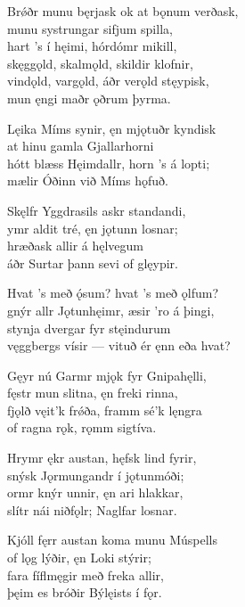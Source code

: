 \bva Brǿðr munu bęrjask \hld ok at bǫnum verðask, \\
munu systrungar \hld sifjum spilla, \\
hart ’s í hęimi, \hld hórdómr mikill, \\
skęggǫld, skalmǫld, \hld skildir klofnir, \\
vindǫld, vargǫld, \hld áðr verǫld stęypisk,\footnotemark[1] \\
mun ęngi maðr \hld ǫðrum þyrma.

\bva Lęika Míms synir, \hld ęn mjǫtuðr kyndisk \\
at hinu gamla \hld Gjallarhorni \\
hótt blæss Hęimdallr, \hld horn ’s á lopti; \\
mælir Óðinn \hld við Míms hǫfuð.

\bva Skęlfr Yggdrasils \hld askr standandi, \\
ymr aldit tré, \hld ęn jǫtunn losnar; \\
hræðask allir \hld á hęlvegum \\
áðr Surtar þann \hld sevi of glęypir.

\bva Hvat ’s með ǫ́sum? \hld hvat ’s með ǫlfum? \\
gnýr allr Jǫtunhęimr, \hld æsir ’ro á þingi, \\
stynja dvergar \hld fyr stęindurum \\
vęggbergs vísir — \hld vituð ér ęnn eða hvat?

\bva Gęyr nú Garmr mjǫk \hld fyr Gnipahęlli, \\
fęstr mun slitna, \hld ęn freki rinna, \\
fjǫlð vęit'k frǿða, \hld framm sé'k lęngra \\
of ragna rǫk, \hld rǫmm sigtíva.

\bva Hrymr ękr austan, \hld hęfsk lind fyrir, \\
snýsk Jǫrmungandr \hld í jǫtunmóði; \\
ormr knýr unnir, \hld ęn ari hlakkar, \\
slítr nái niðfǫlr; \hld Naglfar losnar.

\bva Kjóll fęrr austan \hld koma munu Múspells \\
of lǫg lýðir, \hld ęn Loki stýrir; \\
fara fíflmęgir \hld með freka allir, \\
þęim es bróðir \hld Býlęists í fǫr.

